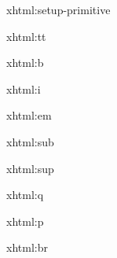 
\startxmlsetups xhtml:setup-primitive
\stopxmlsetups


\startxmlsetups xhtml:tt
	{\tt {}}
\stopxmlsetups

\startxmlsetups xhtml:b
	{\bf {}}
\stopxmlsetups

\startxmlsetups xhtml:i
	{\it {}}
\stopxmlsetups

\startxmlsetups xhtml:em
	{\em {}}
\stopxmlsetups

\startxmlsetups xhtml:sub
\stopxmlsetups

\startxmlsetups xhtml:sup
\stopxmlsetups

\startxmlsetups xhtml:q
\stopxmlsetups

\startxmlsetups xhtml:p
	\par
\stopxmlsetups

\startxmlsetups xhtml:br
	\crlf
\stopxmlsetups

